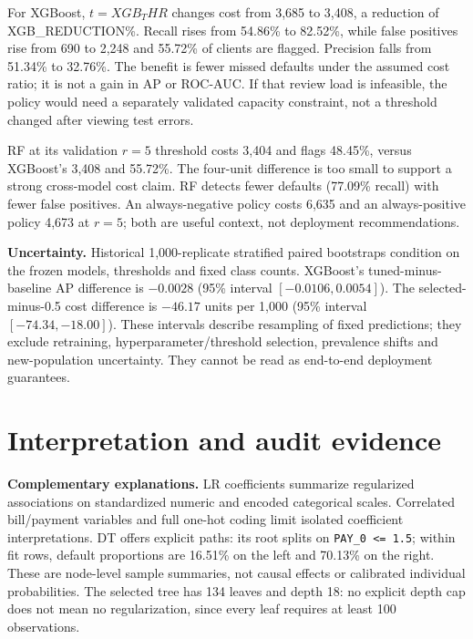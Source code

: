\documentclass{article}
\begin{document}
For XGBoost, $t={{XGB_THR}}$ changes cost from 3,685 to 3,408, a reduction of {{XGB_REDUCTION}}\%. Recall rises from 54.86\% to 82.52\%, while false positives rise from 690 to 2,248 and 55.72\% of clients are flagged. Precision falls from 51.34\% to 32.76\%. The benefit is fewer missed defaults under the assumed cost ratio; it is not a gain in AP or ROC-AUC. If that review load is infeasible, the policy would need a separately validated capacity constraint, not a threshold changed after viewing test errors.

RF at its validation $r=5$ threshold costs 3,404 and flags 48.45\%, versus XGBoost's 3,408 and 55.72\%. The four-unit difference is too small to support a strong cross-model cost claim. RF detects fewer defaults (77.09\% recall) with fewer false positives. An always-negative policy costs 6,635 and an always-positive policy 4,673 at $r=5$; both are useful context, not deployment recommendations.

\textbf{Uncertainty.} Historical 1,000-replicate stratified paired bootstraps condition on the frozen models, thresholds and fixed class counts. XGBoost's tuned-minus-baseline AP difference is $-0.0028$ (95\% interval $[-0.0106,0.0054]$). The selected-minus-0.5 cost difference is $-46.17$ units per 1,000 (95\% interval $[-74.34,-18.00]$). These intervals describe resampling of fixed predictions; they exclude retraining, hyperparameter/threshold selection, prevalence shifts and new-population uncertainty. They cannot be read as end-to-end deployment guarantees.
\newpage
\section{Interpretation and audit evidence}
\textbf{Complementary explanations.} LR coefficients summarize regularized associations on standardized numeric and encoded categorical scales. Correlated bill/payment variables and full one-hot coding limit isolated coefficient interpretations. DT offers explicit paths: its root splits on \texttt{PAY\_0 <= 1.5}; within fit rows, default proportions are 16.51\% on the left and 70.13\% on the right. These are node-level sample summaries, not causal effects or calibrated individual probabilities. The selected tree has 134 leaves and depth 18: no explicit depth cap does not mean no regularization, since every leaf requires at least 100 observations.
\end{document}
